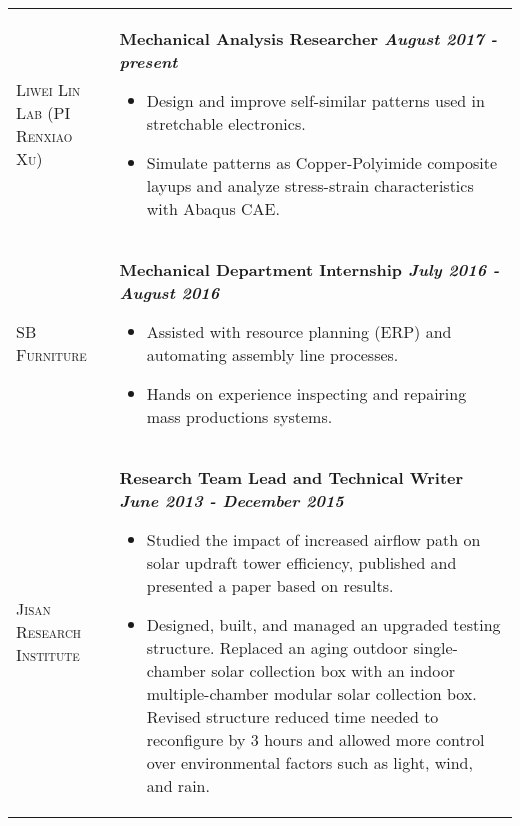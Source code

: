 \documentclass[letterpaper, 10pt]{article}
\begin{document}
\begin{flushleft}
  \begin{tabular}{>{\raggedright}p{1.3in} @{\hskip .2in} l}
      \textsc{Liwei Lin Lab (PI Renxiao Xu)} & \parbox[t]{5.75in}{\textbf{Mechanical Analysis Researcher \hfill\textit{August 2017 - present}} \begin{itemize}
      \item Design and improve self-similar patterns used in stretchable electronics.
      \item Simulate patterns as Copper-Polyimide composite layups and analyze stress-strain characteristics with Abaqus CAE.
      \end{itemize}} \medskip \\
      \textsc{SB Furniture}   & \parbox[t]{5.75in}{\textbf{Mechanical Department Internship \hfill\textit{July 2016 - August 2016}} \begin{itemize}
      \item Assisted with resource planning (ERP) and automating assembly line processes.
      \item Hands on experience inspecting and repairing mass productions systems.
      \end{itemize}} \medskip \\
      \textsc{Jisan Research Institute}   & \parbox[t]{5.75in}{ \textbf{Research Team Lead and Technical Writer \hfill\textit{June 2013 - December 2015}} \begin{itemize}
      \item Studied the impact of increased airflow path on solar updraft tower efficiency, published and presented a paper based on results.
      \item Designed, built, and managed an upgraded testing structure. Replaced an aging outdoor single-chamber solar collection box with an indoor multiple-chamber modular solar collection box. Revised structure reduced time needed to reconfigure by 3 hours and allowed more control over environmental factors such as light, wind, and rain.
      \end{itemize}} \smallskip \\
  \end{tabular}
\end{flushleft}
\end{document}
